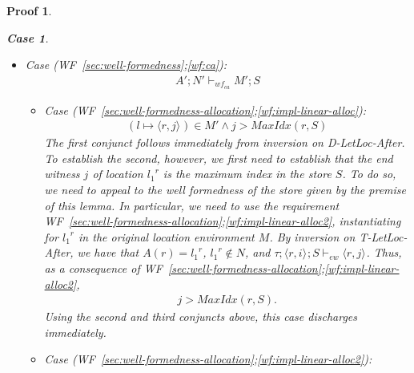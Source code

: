 \documentclass[showabstract,showacknowledgments,showpreface,showdedication,school]{iuphd}
\newtheorem*{bcase}{Case}
\theoremstyle{nonumberplain}
\newtheorem{nproof}{Proof}
\newcommand{\keywd}[1]{\mathit{#1}}
\newcommand{\skeywd}[1]{\mathit{#1}}
\newcommand{\TYP}{\keywd{\tau}}
\newcommand{\loc}{\skeywd{l}}
\newcommand{\concreteloc}[3]{\ensuremath{\langle #1, #2 \rangle ^{#3}}}
\newcommand{\reg}{\skeywd{r}}
\newcommand{\ind}{\keywd{i}}
\newcommand{\indj}{\keywd{j}}
\newcommand{\STOR}{\keywd{S}}
\newcommand{\MENV}{\keywd{M}}
\newcommand{\AENV}{\keywd{A}}
\newcommand{\NENV}{\keywd{N}}
\newcommand{\locreg}[2]{\ensuremath{{#1}^{#2}}}
\newcommand{\allocptr}[2]{\keywd{MaxIdx}(#1,#2)}
\newcommand{\ewitness}[4]{\ensuremath{#1;#2;#3 \vdash_{ew} #4}}
\newcommand{\storewfca}[4]{\ensuremath{#1;#2 \vdash_{wf_{ca}} #3;#4}}
\newcommand{\refwellformed}[2]{WF~\ref{#1};\ref{#2}}
\newcommand{\dletlocafter}{D-LetLoc-After}
\newcommand{\tllafter}{T-LetLoc-After}
\begin{document}
\begin{nproof}
\begin{bcase}
\begin{itemize}
\begin{itemize}
      given in the premise of the lemma is requirement
      \refwellformed{sec:well-formedness-constructors}{wfconstr:constraint-after}
      The specific requirement is to establish that
      \begin{align*}
       (\locreg{\loc_1}{\reg} \mapsto \concreteloc{\reg}{\ind}{}) \in \MENV' \wedge \\
       \ewitness{\TYP}{\concreteloc{\reg}{\ind}{}}{\STOR}{\concreteloc{\reg}{\indj}{}} \wedge \\
       (\loc \mapsto \concreteloc{\reg}{\indj}{}) \in \MENV'
      \end{align*}
      which follows immediately by inversion on \dletlocafter{}.
      \item Case (\refwellformed{sec:well-formedness}{wf:ca}):
      \begin{align*}
      \storewfca{\AENV'}{\NENV'}{\MENV'}{\STOR}
      \end{align*}
        \begin{itemize}
        \item Case (\refwellformed{sec:well-formedness-allocation}{wf:impl-linear-alloc}):
        \begin{align*}
                  (\loc \mapsto \concreteloc{\reg}{\indj}{}) \in \MENV' \wedge
\indj > \allocptr{\reg}{\STOR}
        \end{align*}
        The first conjunct follows immediately from inversion on \dletlocafter{}.
        To establish the second, however, we first need to establish
        that the end witness $\indj$ of location $\locreg{\loc_1}{\reg}$ is the maximum index in the
        store $\STOR$.
        To do so, we need to appeal to the well formedness of the store given by the
        premise of this lemma.
        In particular, we need to use the requirement \refwellformed{sec:well-formedness-allocation}{wf:impl-linear-alloc2},
        instantiating for $\locreg{\loc_1}{\reg}$ in the original location environment $\MENV$.
        By inversion on \tllafter{}, we have that $\AENV(\reg) = \locreg{\loc_1}{\reg}$, $\locreg{\loc_1}{\reg} \not \in \NENV$,
        and $\ewitness{\TYP}{\concreteloc{\reg}{\ind}{}}{\STOR}{\concreteloc{\reg}{\indj}{}}$.
        Thus, as a consequence of \refwellformed{sec:well-formedness-allocation}{wf:impl-linear-alloc2},
        \begin{align*}
\indj > \allocptr{\reg}{\STOR}.
        \end{align*}
        Using the second and third conjuncts above, this case discharges immediately.
        \item Case (\refwellformed{sec:well-formedness-allocation}{wf:impl-linear-alloc2}):

\end{itemize}
\end{itemize}
\end{itemize}
\end{bcase}
\end{nproof}
\end{document}
